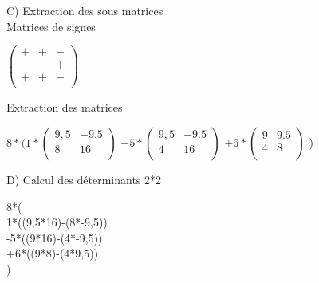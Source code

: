 \vspace{10mm} %

C) Extraction des sous matrices \\

\vspace{5mm} %
Matrices de signes \\

\vspace{5mm} %

$
\begin{pmatrix}
  + & + & - \\
  - & - & + \\
  + & + & - \\
\end{pmatrix}
$


\vspace{10mm} %
Extraction des matrices \\
\vspace{5mm} %

$
8*(
  1*
  \begin{pmatrix}
    9,5 & -9.5 \\
    8 & 16 \\
  \end{pmatrix}
  $
  $
  -5*
  \begin{pmatrix}
    9,5 & -9.5 \\
    4 & 16 \\
  \end{pmatrix}
  $
  $
  +6*
  \begin{pmatrix}
    9 & 9.5 \\
    4 & 8 \\
  \end{pmatrix}
  $
)

\newpage

D) Calcul des déterminants 2*2


\vspace{5mm} %

8*(\\

1*((9,5*16)-(8*-9,5))\\

-5*((9*16)-(4*-9,5))\\

+6*((9*8)-(4*9,5))\\

)

\vspace{10mm} %


